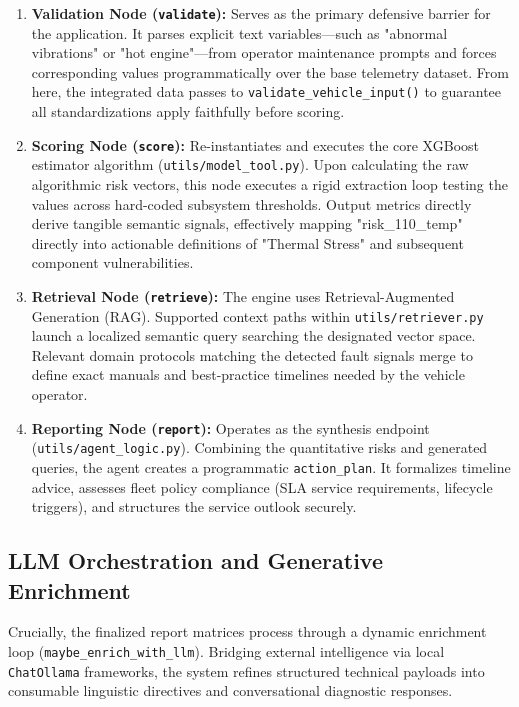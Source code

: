 \documentclass[12pt, a4paper]{article}
\begin{document}
\begin{enumerate}
    \item \textbf{Validation Node (\texttt{validate}):} Serves as the primary defensive barrier for the application. It parses explicit text variables—such as "abnormal vibrations" or "hot engine"—from operator maintenance prompts and forces corresponding values programmatically over the base telemetry dataset. From here, the integrated data passes to \texttt{validate\_vehicle\_input()} to guarantee all standardizations apply faithfully before scoring.
    
    \item \textbf{Scoring Node (\texttt{score}):} Re-instantiates and executes the core XGBoost estimator algorithm (\texttt{utils/model\_tool.py}). Upon calculating the raw algorithmic risk vectors, this node executes a rigid extraction loop testing the values across hard-coded subsystem thresholds. Output metrics directly derive tangible semantic signals, effectively mapping "risk\_110\_temp" directly into actionable definitions of "Thermal Stress" and subsequent component vulnerabilities.
    
    \item \textbf{Retrieval Node (\texttt{retrieve}):} The engine uses Retrieval-Augmented Generation (RAG). Supported context paths within \texttt{utils/retriever.py} launch a localized semantic query searching the designated vector space. Relevant domain protocols matching the detected fault signals merge to define exact manuals and best-practice timelines needed by the vehicle operator.
    
    \item \textbf{Reporting Node (\texttt{report}):} Operates as the synthesis endpoint (\texttt{utils/agent\_logic.py}). Combining the quantitative risks and generated queries, the agent creates a programmatic \texttt{action\_plan}. It formalizes timeline advice, assesses fleet policy compliance (SLA service requirements, lifecycle triggers), and structures the service outlook securely.
\end{enumerate}

\subsection{LLM Orchestration and Generative Enrichment}

Crucially, the finalized report matrices process through a dynamic enrichment loop (\texttt{maybe\_enrich\_with\_llm}). Bridging external intelligence via local \texttt{ChatOllama} frameworks, the system refines structured technical payloads into consumable linguistic directives and conversational diagnostic responses.
\end{document}
